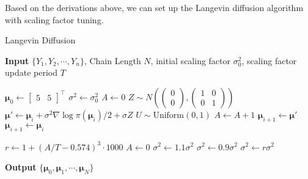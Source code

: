 \documentclass[12pt]{article}
\begin{document}
Based on the derivations above, we can set up the Langevin diffusion algorithm with scaling factor tuning.

\begin{algorithm}
	\caption{Langevin Diffusion}
	\hspace*{\algorithmicindent} \textbf{Input}  $\{Y_1, Y_2, \cdots, Y_n \}$, Chain Length $N$, initial scaling factor $\sigma_0^2$, scaling factor update period $T$ 
	\begin{algorithmic}[1]
		\State $\bm{\mu}_0 \gets \begin{bmatrix}5 & 5\end{bmatrix}^\top$
		\State $\sigma^2 \gets \sigma_0^2$
		\State $A \gets 0$ 
		\State $Z\sim N\left(\begin{pmatrix}0 \\ 0\end{pmatrix}, \begin{pmatrix}1 & 0 \\ 0 & 1\end{pmatrix} \right)$
		\State $\bm{\mu}' \gets \bm{\mu}_i + \sigma^2 \nabla \log \pi(\bm{\mu}_i)/2 + \sigma Z$
		\State $U\sim \text{Uniform}(0, 1)$
		\State $A\gets A+1$
		\State $\bm{\mu}_{i+1}\gets \bm{\mu}'$
		\Else
		\State $\bm{\mu}_{i+1}\gets \bm{\mu}_{i}$
		\EndIf
		
		 
			\State $r\gets 1+(A/T - 0.574)^3 \cdot 1000$
			\State $A\gets 0$
				\State $\sigma^2 \gets 1.1\sigma^2$
				\State $\sigma^2 \gets 0.9\sigma^2$
			\Else
				\State $\sigma^2 \gets r \sigma^2$
			\EndIf
		\EndIf
		\EndFor
	\end{algorithmic}
	\hspace*{\algorithmicindent} \textbf{Output} $\{ \bm{\mu}_0, \bm{\mu}_1, \cdots, \bm{\mu}_N \}$
\end{algorithm}
\end{document}
